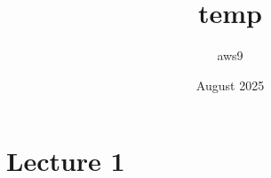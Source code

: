 \documentclass{article}
\title{temp}
\author{aws9 }
\date{August 2025}
\begin{document}
\maketitle

\section{Lecture 1}
\end{document}
